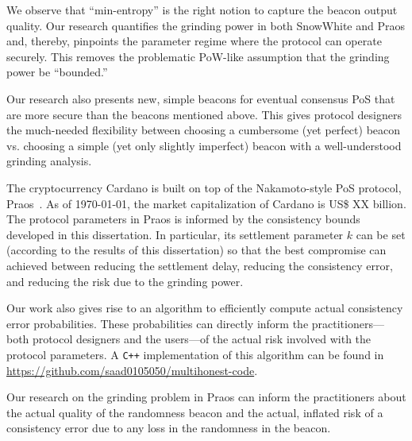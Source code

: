   We observe that ``min-entropy'' is the right notion 
  to capture the beacon output quality. 
  Our research quantifies the grinding power in both SnowWhite and Praos 
  and, thereby, pinpoints the parameter regime where the protocol can operate securely. 
  This removes the problematic PoW-like assumption that the grinding power be ``bounded.''

  Our research also presents new, simple beacons for eventual consensus PoS 
  that are more secure than the beacons mentioned above. 
  This gives protocol designers the much-needed flexibility 
  between choosing a cumbersome (yet perfect) beacon 
  vs. 
  choosing a simple (yet only slightly imperfect) beacon 
  with a well-understood grinding analysis.


  The cryptocurrency Cardano is built on top of the Nakamoto-style PoS protocol, Praos~\cite{Praos}.
  As of \today, 
  the market capitalization of Cardano is {\color{red} US\$ XX billion}. 
  The protocol parameters in Praos is 
  informed by the consistency bounds developed in this dissertation. 
  In particular, its settlement parameter $k$ can be set 
  (according to the results of this dissertation) 
  so that the best compromise can achieved between 
  reducing the settlement delay, 
  reducing the consistency error, 
  and reducing the risk due to the grinding power.

  Our work also gives rise to an algorithm 
  to efficiently compute actual consistency error probabilities. 
  These probabilities can directly inform the practitioners---both protocol designers and the users---of 
  the actual risk involved with the protocol parameters. 
  A \texttt{C++} implementation of this algorithm can be found in 
  \url{https://github.com/saad0105050/multihonest-code}.

  Our research on the grinding problem in Praos 
  can inform the practitioners 
  about the actual quality of the randomness beacon 
  and the actual, inflated risk of a consistency error 
  due to any loss in the randomness in the beacon.


